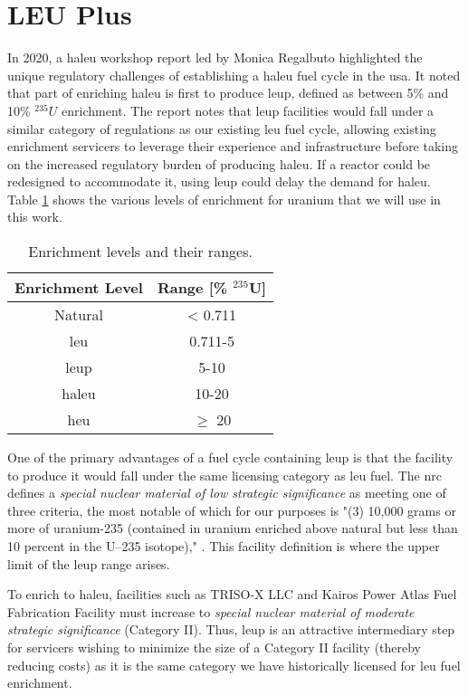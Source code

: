 \section{LEU Plus}
\label{sec:leup}

In 2020, a \gls{haleu} workshop report led by Monica Regalbuto \cite{regalbuto_high_assay_2020} highlighted the unique regulatory challenges of establishing a \gls{haleu} fuel cycle in the \gls{usa}. It noted that part of enriching \gls{haleu} is first to produce \gls{leup}, defined as between 5\% and 10\% $^{235}U$ enrichment. The report notes that \gls{leup} facilities would fall under a similar category of regulations as our existing \gls{leu} fuel cycle, allowing existing enrichment servicers to leverage their experience and infrastructure before taking on the increased regulatory burden of producing \gls{haleu}. If a reactor could be redesigned to accommodate it, using \gls{leup} could delay the demand for \gls{haleu}. Table \ref{tab:enrichment_levels} shows the various levels of enrichment for uranium that we will use in this work.

\begin{table}[H]
   \centering
   \caption{Enrichment levels and their ranges.}
   \label{tab:enrichment_levels}
   \begin{tabular}{c c}
      \hline
      \textbf{Enrichment Level} & \textbf{Range [\%  $^{235}$U]} \\
      \hline
      Natural & < 0.711 \\
      \gls{leu} & 0.711-5 \\
      \gls{leup} & 5-10 \\
      \gls{haleu} & 10-20 \\
      \gls{heu} & $\geq$ 20  \\
      \hline
   \end{tabular}
\end{table}

One of the primary advantages of a fuel cycle containing \gls{leup} is that the facility to produce it would fall under the same licensing category as \gls{leu} fuel. The \gls{nrc} defines a \textit{special nuclear material of low strategic significance} as meeting one of three criteria, the most notable of which for our purposes is "(3) 10,000 grams or more of uranium-235 (contained in uranium enriched above natural but less than 10 percent in the U–235 isotope)," \cite{nrc_catiii}. This facility definition is where the upper limit of the \gls{leup} range arises.

To enrich to \gls{haleu}, facilities such as TRISO-X LLC and Kairos Power Atlas Fuel Fabrication Facility must increase to \textit{special nuclear material of moderate strategic significance} (Category II). Thus, \gls{leup} is an attractive intermediary step for servicers wishing to minimize the size of a Category II facility (thereby reducing costs) as it is the same category we have historically licensed for \gls{leu} fuel enrichment.

